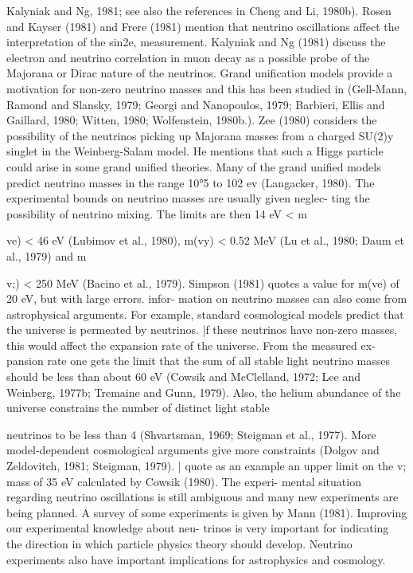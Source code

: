 \documentclass[twoside]{article}
\begin{document}
{{{{{{Kalyniak and Ng, 1981; see also the references in Cheng and Li, 1980b).
Rosen and Kayser (1981) and Frere (1981) mention that neutrino
oscillations affect the interpretation of the sin2e, measurement.
Kalyniak and Ng (1981) discuss the electron and neutrino correlation in
muon decay as a possible probe of the Majorana or Dirac nature of the
neutrinos. Grand unification models provide a motivation for non-zero
neutrino masses and this has been studied in (Gell-Mann, Ramond and
Slansky, 1979; Georgi and Nanopoulos, 1979; Barbieri, Ellis and Gaillard,
1980; Witten, 1980; Wolfenstein, 1980b.). Zee (1980) considers the
possibility of the neutrinos picking up Majorana masses from a charged
SU(2)y singlet in the Weinberg-Salam model. He mentions that such a
Higgs particle could arise in some grand unified theories. Many of the
grand unified models predict neutrino masses in the range 10°5 to 102 ev
(Langacker, 1980).
The experimental bounds on neutrino masses are usually given neglec-
ting the possibility of neutrino mixing. The limits are then 14 eV <
m{ve) < 46 eV (Lubimov et al., 1980), m(vy) < 0.52 MeV (Lu et al., 1980;
Daum et al., 1979) and m{v;) < 250 MeV (Bacino et al., 1979). Simpson
(1981) quotes a value for m(ve) of 20 eV, but with large errors. infor-
mation on neutrino masses can also come from astrophysical arguments.
For example, standard cosmological models predict that the universe is
permeated by neutrinos. |f these neutrinos have non-zero masses, this
would affect the expansion rate of the universe. From the measured ex-
pansion rate one gets the limit that the sum of all stable light neutrino
masses should be less than about 60 eV (Cowsik and McClelland, 1972;
Lee and Weinberg, 1977b; Tremaine and Gunn, 1979). Also, the helium
abundance of the universe constrains the number of distinct light stable

neutrinos to be less than 4 (Shvartsman, 1969; Steigman et al., 1977).
More model-dependent cosmological arguments give more constraints (Dolgov
and Zeldovitch, 1981; Steigman, 1979). | quote as an example an upper
limit on the v; mass of 35 eV calculated by Cowsik (1980). The experi-
mental situation regarding neutrino oscillations is still ambiguous and
many new experiments are being planned. A survey of some experiments is
given by Mann (1981). Improving our experimental knowledge about neu-
trinos is very important for indicating the direction in which particle
physics theory should develop. Neutrino experiments also have important
implications for astrophysics and cosmology.

}}}}}}}}
\end{document}
